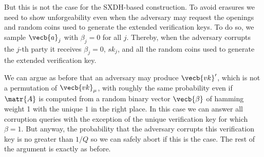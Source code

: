 But this is not the case for the SXDH-based construction.
To avoid erasures we need to show unforgeability even when the adversary may request the openings and random coins used to generate the extended verification keys. To do so, we sample $\vecb{a}_j$ with $\beta_j=0$ for all $j$. Thereby, when the adversary corrupts the $j$-th party it receives $\beta_j=0$, $sk_j$, and all the random coins used to generate the extended verification key.

We can argue as before that an adversary may produce $\vecb{vk}'$, which is not a permutation of $\vecb{vk}_\mu$,
with roughly the same probability even if $\matr{A}$ is computed from a random binary vector $\vecb{\beta}$ of hamming weight 1 with the unique $1$ in the right place. In this case we can answer all corruption queries with the exception of the unique verification key for which $\beta=1$. But anyway, the probability that the adversary corrupts this verification key is no greater than $1/Q$ so we can safely abort if this is the case. The rest of the argument is exactly as before.





